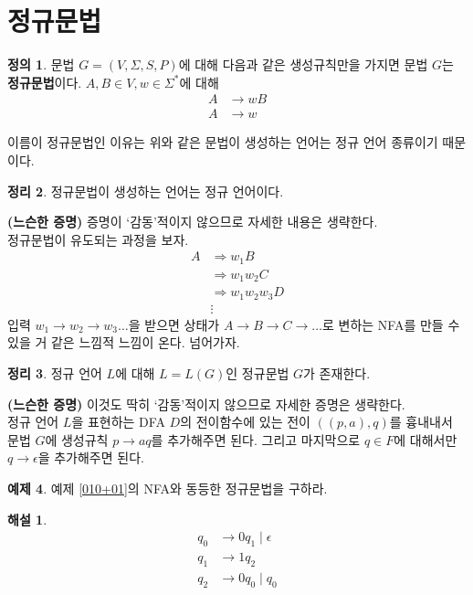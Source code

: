 \documentclass[b5paper, 11pt]{book}
\theoremstyle{definition}
\newtheorem{defn}{정의}[chapter]
\newtheorem{thm}[defn]{정리}
\newtheorem{ex}[defn]{예제}
\newtheorem*{ans*}{해설}
\newenvironment{pf*}{\pushQED{\qed}\pf}
{\popQED\endpf}
\begin{document}
\section{정규문법}
\begin{defn} 
문법 $G = (V, \Sigma, S, P)$에 대해 다음과 같은 생성규칙만을 가지면 문법 
$G$는 \textbf{정규문법}이다. $A,B \in V, w \in \Sigma^{*}$에 대해 
\begin{align*}
    A &\rightarrow wB \\ 
    A &\rightarrow w
\end{align*}
\end{defn}
이름이 정규문법인 이유는 위와 같은 문법이 생성하는 언어는 정규 언어 종류이기 때문이다.
\begin{thm}
정규문법이 생성하는 언어는 정규 언어이다.
\end{thm}
\begin{pf*}
\textbf{(느슨한 증명)} 증명이 `감동'적이지 않으므로 자세한 내용은 생략한다. \\
정규문법이 유도되는 과정을 보자. 
\begin{align*}
    A &\Rightarrow w_1 B \\ 
    & \Rightarrow w_1w_2 C \\ 
    & \Rightarrow w_1w_2w_3 D \\ 
    & \vdots
\end{align*}
입력 $w_1\rightarrow w_2 \rightarrow w_3 \ldots$을 받으면  상태가 $A \rightarrow B \rightarrow C \rightarrow \ldots$로 변하는 NFA를 만들 수 있을 거 같은 느낌적 느낌이 온다. 넘어가자.
\end{pf*}
\begin{thm}
    정규 언어 $L$에 대해 $L = L(G)$인 정규문법 $G$가 존재한다. 
\end{thm}
\begin{pf*}
    \textbf{(느슨한 증명)} 이것도 딱히 `감동'적이지 않으므로 자세한 증명은 생략한다. \\
    정규 언어 $L$을 표현하는 DFA $D$의 전이함수에 있는 전이
    $((p, a), q)$를 흉내내서 문법 $G$에 생성규칙 $p \rightarrow aq$를 추가해주면 된다.
    그리고 마지막으로 $q \in F$에 대해서만 $q \rightarrow \epsilon$을 추가해주면 된다.
\end{pf*}
\begin{ex}
    예제 \ref{010+01}의 NFA와 동등한 정규문법을 구하라. 
\end{ex}
\begin{ans*}
    \begin{align*}
        q_0 & \rightarrow 0q_1 \; \vert \; \epsilon \\ 
        q_1 & \rightarrow 1q_2 \\ 
        q_2 & \rightarrow 0q_0 \; \vert \; q_0
    \end{align*}
\end{ans*}
\end{document}
